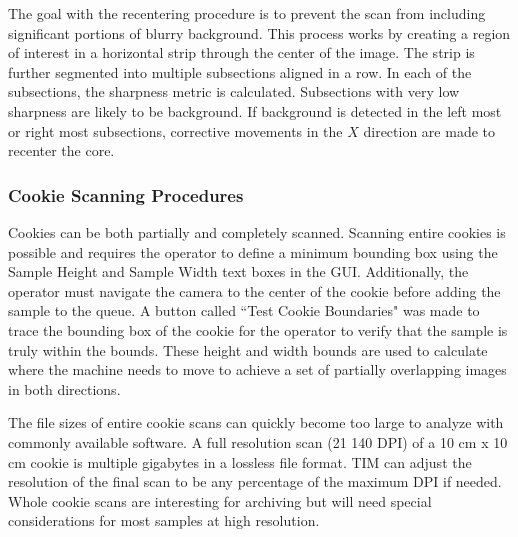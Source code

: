 \documentclass[a4paper,12pt]{article}
\begin{document}
The goal with the recentering procedure is to prevent the scan from including significant portions of blurry background.
This process works by creating a region of interest in a horizontal strip through the center of the image. The strip is further segmented into multiple subsections aligned in a row.
In each of the subsections, the sharpness metric is calculated. Subsections with very low sharpness are likely to be background.
If background is detected in the left most or right most subsections, corrective movements in the $X$ direction are made to recenter the core.


\subsubsection{Cookie Scanning Procedures}  

Cookies can be both partially and completely scanned. Scanning entire cookies is possible and requires the operator to define a minimum bounding box using the Sample Height and Sample Width text boxes in the GUI.
Additionally, the operator must navigate the camera to the center of the cookie before adding the sample to the queue. A button called ``Test Cookie Boundaries" was made to trace the bounding box of the cookie for the operator
to verify that the sample is truly within the bounds. These height and width bounds are used to calculate where the machine needs to move to achieve a set of partially overlapping images in both directions. 

The file sizes of entire cookie scans can quickly become too large to analyze with commonly available software. A full resolution scan (21 140 DPI) of a 10 cm x 10 cm cookie is multiple gigabytes in a lossless file format. 
TIM can adjust the resolution of the final scan to be any percentage of the maximum DPI if needed. Whole cookie scans are interesting for archiving but will need special considerations for most samples at high resolution. 
\end{document}
